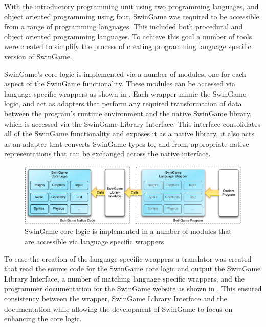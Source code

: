 With the introductory programming unit using two programming languages, and object oriented programming using four, SwinGame was required to be accessible from a range of programming languages. This included both procedural and object oriented programming languages. To achieve this goal a number of tools were created to simplify the process of creating programming language specific version of SwinGame.

SwinGame's core logic is implemented via a number of modules, one for each aspect of the SwinGame functionality. These modules can be accessed via language specific wrappers as shown in . Each wrapper mimic the SwinGame logic, and act as adapters that perform any required transformation of data between the program's runtime environment and the native SwinGame library, which is accessed via the SwinGame Library Interface. This interface consolidates all of the SwinGame functionality and exposes it as a native library, it also acts as an adapter that converts SwinGame types to, and from, appropriate native representations that can be exchanged across the native interface. 

\begin{figure}[thbp]
  \centering
  \includegraphics[width=\textwidth]{SwinGameArch}
  \caption{SwinGame core logic is implemented in a number of modules that are accessible via language specific wrappers }
  \label{fig:swingame_arch}
\end{figure}

To ease the creation of the language specific wrappers a translator was created that read the source code for the SwinGame core logic and output the SwinGame Library Interface, a number of matching language specific wrappers, and the programmer documentation for the SwinGame website as shown in . This ensured consistency between the wrapper, SwinGame Library Interface and the documentation while allowing the development of SwinGame to focus on enhancing the core logic.

